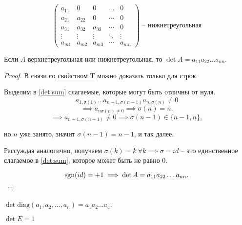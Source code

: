 \begin{equation*}
    \begin{pmatrix}
        a_{11} & 0 & 0 & \dots & 0 \\
        a_{21} & a_{22} & 0 & \cdots & 0 \\
        a_{31} & a_{32} & a_{33} & \cdots & 0 \\
        \vdots & \vdots & \vdots & \ddots & \vdots \\
        a_{m1} & a_{m2} & a_{m3} & \cdots & a_{mn}
    \end{pmatrix} \text{ -- нижнетреугольная}
\end{equation*}

\begin{comment}
    Всякая ступенчатая квадратная матрица верхнетреугольна.
\end{comment}

\begin{description}[resume]
\item[Свойство 6\label{det:prop_6}]
    Если $A$ верхнетреугольная или нижнетреугольная, то $\det A = a_{11} a_{22} \dots a_{nn}$.

    \begin{proof}
        В связи со \hyperref[det:prop_t]{свойством T} можно доказать только для строк.

        Выделим в \eqref{det:sum} слагаемые, которые могут быть отличны от нуля.
        \begin{equation*}
            a_{1, \sigma(1)} \dots a_{n - 1, \sigma(n - 1)} a_{n, \sigma(n)} \neq 0
        \end{equation*}
        \begin{equation*}
            \implies a_{n\sigma(n) \neq 0} \implies \sigma(n) = n
        .\end{equation*}
        \begin{equation*}
            \implies a_{n - 1, \sigma(n - 1)} \neq 0 \implies \sigma(n - 1) \in \{n - 1, n\},
        \end{equation*}

        но $n$ уже занято, значит $\sigma(n - 1) = n - 1$, и так далее.

        Рассуждая аналогично, получаем $\sigma(k) = k \ \forall k \implies \sigma = id$ -- это единственное слагаемое в \eqref{det:sum}, которое может быть не равно 0.

        \begin{equation*}
            \operatorname{\mathop{\mathrm{sgn}}}(id) = +1 \implies \det A = a_{11} a_{22} \dots a_{nn}
        .\end{equation*}
    \end{proof}

    \begin{corollary}
        $\det \text{diag}(a_1, a_2, \dots, a_n) = a_1 a_2 \dots a_4$.
    \end{corollary}

    \begin{corollary}
        $\det E = 1$
    \end{corollary}
\end{description}


